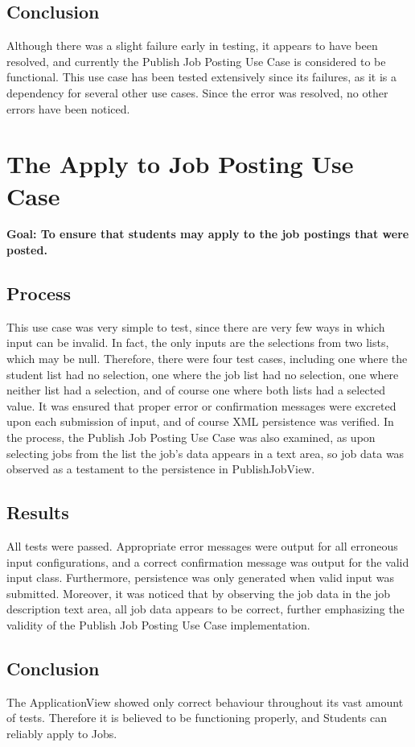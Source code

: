 \documentclass[12pt]{report}
\begin{document}
\subsection*{Conclusion}
Although there was a slight failure early in testing, it appears to have been resolved, and
currently the Publish Job Posting Use Case is considered to be functional. This use case has been
tested extensively since its failures, as it is a dependency for several other use cases. Since the
error was resolved, no other errors have been noticed.

\section{The Apply to Job Posting Use Case}
\label{s:nine}
\textbf{Goal: To ensure that students may apply to the job postings that were posted.}
\subsection*{Process}
This use case was very simple to test, since there are very few ways in which input can be invalid.
In fact, the only inputs are the selections from two lists, which may be null. Therefore, there
were four test cases, including one where the student list had no selection, one where the job list
had no selection, one where neither list had a selection, and of course one where both lists had a
selected value. It was ensured that proper error or confirmation messages were excreted upon each
submission of input, and of course XML persistence was verified. In the process, the Publish Job
Posting Use Case was also examined, as upon selecting jobs from the list the job's data appears in a
text area, so job data was observed as a testament to the persistence in PublishJobView.
\subsection*{Results}
All tests were passed. Appropriate error messages were output for all erroneous input
configurations, and a correct confirmation message was output for the valid input class.
Furthermore, persistence was only generated when valid input was submitted. Moreover, it was noticed
that by observing the job data in the job description text area, all job data appears to be correct,
further emphasizing the validity of the Publish Job Posting Use Case implementation.
\subsection*{Conclusion}
The ApplicationView showed only correct behaviour throughout its vast amount of tests. Therefore it
is believed to be functioning properly, and Students can reliably apply to Jobs.
\end{document}
